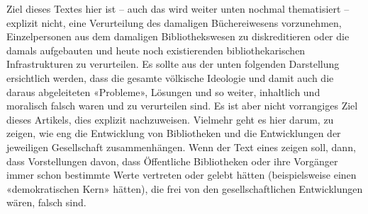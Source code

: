 \documentclass[a4paper,
fontsize=11pt,
oneside,
numbers=noperiodatend,
parskip=half-,
bibliography=totoc,
final
]{scrartcl}
\begin{document}
Ziel dieses Textes hier ist -- auch das wird weiter unten nochmal
thematisiert -- explizit nicht, eine Verurteilung des damaligen
Büchereiwesens vorzunehmen, Einzelpersonen aus dem damaligen
Bibliothekswesen zu diskreditieren oder die damals aufgebauten und heute
noch existierenden bibliothekarischen Infrastrukturen zu verurteilen. Es
sollte aus der unten folgenden Darstellung ersichtlich werden, dass die
gesamte völkische Ideologie und damit auch die daraus abgeleiteten
«Probleme», Lösungen und so weiter, inhaltlich und moralisch falsch
waren und zu verurteilen sind. Es ist aber nicht vorrangiges Ziel dieses
Artikels, dies explizit nachzuweisen. Vielmehr geht es hier darum, zu
zeigen, wie eng die Entwicklung von Bibliotheken und die Entwicklungen
der jeweiligen Gesellschaft zusammenhängen. Wenn der Text eines zeigen
soll, dann, dass Vorstellungen davon, dass Öffentliche Bibliotheken oder
ihre Vorgänger immer schon bestimmte Werte vertreten oder gelebt hätten
(beispielsweise einen «demokratischen Kern» hätten), die frei von den
gesellschaftlichen Entwicklungen wären, falsch sind.
\end{document}
